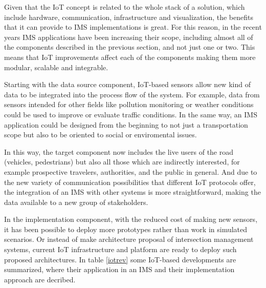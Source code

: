 \documentclass[conference]{IEEEtran}
\begin{document}
Given that the IoT concept is related to the whole stack of a solution, which include hardware, communication, infrastructure and visualization, the benefits that it can provide to IMS implementations is great. For this reason, in the recent years IMS applications have been increasing their scope, including almost all of the components described in the previous section, and not just one or two. This means that IoT improvements affect each of the components making them more modular, scalable and integrable.

Starting with the data source component, IoT-based sensors allow new kind of data to be integrated into the process flow of the system. For example, data from sensors intended for other fields like pollution monitoring or weather conditions could be used to improve or evaluate traffic conditions. In the same way, an IMS application could be designed from the beginning to not just a transportation scope but also to be oriented to social or enviromental issues.

In this way, the target component now includes the live users of the road (vehicles, pedestrians) but also all those which are indirectly interested, for example prospective travelers, authorities, and the public in general. And due to the new variety of communication possibilities that different IoT protocols offer, the integration of an IMS with other systems is more straightforward, making the data available to a new group of stakeholders.

In the implementation component, with the reduced cost of making new sensors, it has been possible to deploy more prototypes rather than work in simulated scenarios. Or instead of make architecture proposal of intersection management systems, current IoT infrastructure and platform are ready to deploy such proposed architectures. In table \ref{iotrev} some IoT-based developments are summarized, where their application in an IMS and their implementation approach are decribed.
\end{document}
